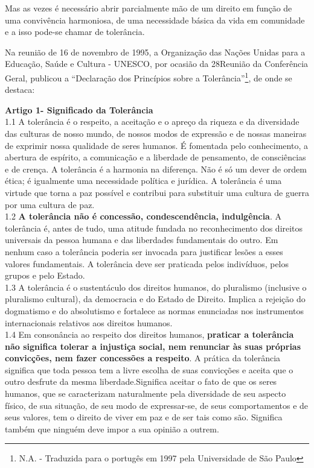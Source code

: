 \documentclass[
	12pt,				%
	openright,			%
	twoside,			%
	a4paper,			%
	chapter=TITLE,		%
	section=TITLE,		%
	subsection=TITLE,	%
	subsubsection=TITLE,%
	spanish,            %
	english,			%
	brazil				%
	]{abntex2}
\begin{document}
\par
Mas as vezes é necessário abrir parcialmente mão de um direito em função de uma convivência harmoniosa, de uma necessidade básica da vida em comunidade e a isso pode-se chamar de tolerância.
\par
Na reunião de 16 de novembro de 1995, a Organização das Nações Unidas para a Educação, Saúde e Cultura - UNESCO, por ocasião da 28\textordfeminine Reunião da Conferência Geral, publicou a “Declaração dos Princípios sobre a Tolerância”\footnote{N.A. - Traduzida para o portugês em 1997 pela Universidade de São Paulo}, de onde se destaca:
\begin{citacao}
	\textbf{Artigo 1\textordmasculine - Significado da Tolerância} \\
		1.1 A tolerância é o respeito, a aceitação e o apreço da riqueza e da diversidade das culturas de nosso mundo, de nossos modos de expressão e de nossas maneiras de exprimir nossa qualidade de seres humanos. É fomentada pelo conhecimento, a abertura de espírito, a comunicação e a liberdade de pensamento, de consciências e de crença. A tolerância é a harmonia na diferença. Não é só um dever de ordem ética; é igualmente uma necessidade política e jurídica. A tolerância é uma virtude que torna a paz possível e contribui para substituir uma cultura de guerra por uma cultura de paz.\\
		1.2 \textbf{A tolerância não é concessão, condescendência, indulgência}. A tolerância é, antes de tudo, uma atitude fundada no reconhecimento dos direitos universais da pessoa humana e das liberdades fundamentais do outro. Em nenhum caso a tolerância poderia ser invocada para justificar lesões a esses valores fundamentais. A tolerância deve ser praticada pelos indivíduos, pelos grupos e pelo Estado.\\
		1.3 A tolerância é o sustentáculo dos direitos humanos, do pluralismo (inclusive o pluralismo cultural), da democracia e do Estado de Direito. Implica a rejeição do dogmatismo e do absolutismo e fortalece as normas enunciadas nos instrumentos internacionais relativos aos direitos humanos. \\
		1.4 Em consonância ao respeito dos direitos humanos, \textbf{praticar a tolerância não significa tolerar a injustiça social, nem renunciar às suas próprias convicções, nem fazer concessões a respeito}. A prática da tolerância significa que toda pessoa tem a livre escolha de suas convicções e aceita que o outro desfrute da mesma liberdade.Significa aceitar o fato de que os seres humanos, que se caracterizam naturalmente pela diversidade de seu aspecto físico, de sua situação, de seu modo de expressar-se, de seus comportamentos e de seus valores, tem o direito de viver em paz e de ser tais como são. Significa também que ninguém deve impor a sua opinião a outrem. \\

\end{citacao}
\end{document}
